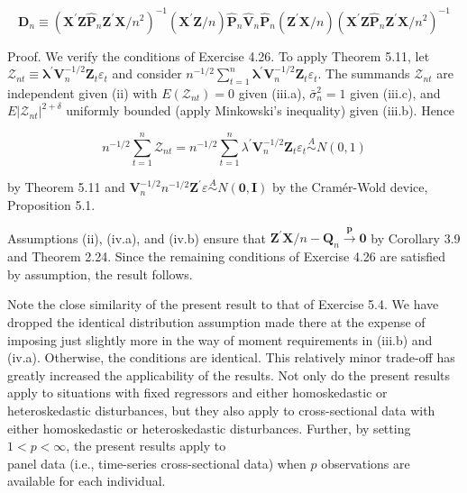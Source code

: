 \documentclass[10pt]{article}
\begin{document}
$$
\mathbf{D}_{n} \equiv\left(\mathbf{X}^{\prime} \mathbf{Z} \hat{\mathbf{P}}_{n} \mathbf{Z}^{\prime} \mathbf{X} / n^{2}\right)^{-1}\left(\mathbf{X}^{\prime} \mathbf{Z} / n\right) \hat{\mathbf{P}}_{n} \hat{\mathbf{V}}_{n} \hat{\mathbf{P}}_{n}\left(\mathbf{Z}^{\prime} \mathbf{X} / n\right)\left(\mathbf{X}^{\prime} \mathbf{Z} \hat{\mathbf{P}}_{n} \mathbf{Z}^{\prime} \mathbf{X} / n^{2}\right)^{-1}
$$

Proof. We verify the conditions of Exercise 4.26. To apply Theorem 5.11, let $\mathcal{Z}_{n t} \equiv \boldsymbol{\lambda}^{\prime} \boldsymbol{V}_{n}^{-1 / 2} \boldsymbol{Z}_{t} \varepsilon_{t}$ and consider $n^{-1 / 2} \sum_{t=1}^{n} \boldsymbol{\lambda}^{\prime} \boldsymbol{V}_{n}^{-1 / 2} \boldsymbol{Z}_{t} \varepsilon_{t}$. The summands $\mathcal{Z}_{n t}$ are independent given (ii) with $E\left(\mathcal{Z}_{n t}\right)=0$ given (iii.a), $\bar{\sigma}_{n}^{2}=1$ given (iii.c), and $E\left|\mathcal{Z}_{n t}\right|^{2+\delta}$ uniformly bounded (apply Minkowski's inequality) given (iii.b). Hence

$$
n^{-1 / 2} \sum_{t=1}^{n} \mathcal{Z}_{n t}=n^{-1 / 2} \sum_{t=1}^{n} \lambda^{\prime} \mathbf{V}_{n}^{-1 / 2} \mathbf{Z}_{t} \varepsilon_{t} \stackrel{A}{\sim} N(0,1)
$$

by Theorem 5.11 and $\mathbf{V}_{n}^{-1 / 2} n^{-1 / 2} \mathbf{Z}^{\prime} \varepsilon \stackrel{A}{\sim} N(\mathbf{0}, \mathbf{I})$ by the Cramér-Wold device, Proposition 5.1.

Assumptions (ii), (iv.a), and (iv.b) ensure that $\mathbf{Z}^{\prime} \mathbf{X} / n-\mathbf{Q}_{n} \xrightarrow{\boldsymbol{p}} \mathbf{0}$ by Corollary 3.9 and Theorem 2.24. Since the remaining conditions of Exercise 4.26 are satisfied by assumption, the result follows.

Note the close similarity of the present result to that of Exercise 5.4. We have dropped the identical distribution assumption made there at the expense of imposing just slightly more in the way of moment requirements in (iii.b) and (iv.a). Otherwise, the conditions are identical. This relatively minor trade-off has greatly increased the applicability of the results. Not only do the present results apply to situations with fixed regressors and either homoskedastic or heteroskedastic disturbances, but they also apply to cross-sectional data with either homoskedastic or heteroskedastic disturbances. Further, by setting $1<p<\infty$, the present results apply to\\
panel data (i.e., time-series cross-sectional data) when $p$ observations are available for each individual.
\end{document}
